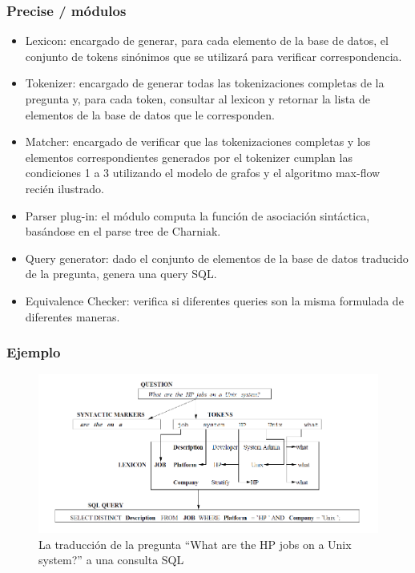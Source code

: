 \documentclass{beamer}
\begin{document}
\fontsize{9.5pt}{7.2}\selectfont
\begin{frame}
\frametitle{Precise / módulos}

\begin{itemize}
  \item Lexicon: encargado de generar, para cada elemento de la base de datos, el conjunto de tokens sinónimos que se utilizará para verificar correspondencia.
  \item Tokenizer: encargado de generar todas las tokenizaciones completas de la pregunta y, para cada token, consultar al lexicon y retornar la lista de elementos de la base de datos que le corresponden.
  \item Matcher: encargado de verificar que las tokenizaciones completas y los elementos correspondientes generados por el tokenizer cumplan las condiciones 1 a 3 utilizando el modelo de grafos y el algoritmo max-flow recién ilustrado.
  \item Parser plug-in: el módulo computa la función de asociación sintáctica, basándose en el parse tree de Charniak.
  \item Query generator: dado el conjunto de elementos de la base de datos traducido de la pregunta, genera una query SQL.
  \item Equivalence Checker: verifica si diferentes queries son la misma formulada de diferentes maneras.
\end{itemize}
\end{frame}


\fontsize{11pt}{7.2}\selectfont
\begin{frame}
\frametitle{Ejemplo}
\begin{figure}
  \centering
    \includegraphics[scale=.7]{graficos/popescu-example}
  \caption{La traducción de la pregunta ``What are the HP jobs on a Unix system?'' a una consulta SQL}
  \label{fig:popescu-example}
\end{figure}

\end{frame}
\end{document}
